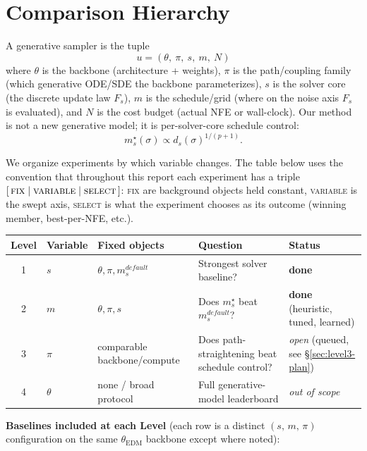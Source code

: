 \documentclass[11pt]{article}
\begin{document}
\section{Comparison Hierarchy}

A generative sampler is the tuple
\[
u = (\theta,\ \pi,\ s,\ m,\ N)
\]
where \(\theta\) is the backbone (architecture + weights), \(\pi\) is the path/coupling family (which generative ODE/SDE the backbone parameterizes), \(s\) is the solver core (the discrete update law \(F_s\)), \(m\) is the schedule/grid (where on the noise axis \(F_s\) is evaluated), and \(N\) is the cost budget (actual NFE or wall-clock). Our method is not a new generative model; it is per-solver-core schedule control:
\[
m^\star_s(\sigma) \propto d_s(\sigma)^{1/(p+1)}.
\]

We organize experiments by which variable changes. The table below uses
the convention that throughout this report each experiment has a triple
\([\,\textsc{fix} \mid \textsc{variable} \mid \textsc{select}\,]\):
\textsc{fix} are background objects held constant, \textsc{variable}
is the swept axis, \textsc{select} is what the experiment chooses as
its outcome (winning member, best-per-NFE, etc.).

\begin{center}
\scriptsize
\begin{tabular}{c l l p{4.4cm} l}
\toprule
Level & Variable & Fixed objects & Question & Status \\
\midrule
1 & \(s\)      & \(\theta,\pi,m_s^{default}\)         & Strongest solver baseline? & \textbf{done} \\
2 & \(m\)      & \(\theta,\pi,s\)                     & Does \(m^\star_s\) beat \(m_s^{default}\)? & \textbf{done} (heuristic, tuned, learned) \\
3 & \(\pi\)    & comparable backbone/compute          & Does path-straightening beat schedule control? & \emph{open} (queued, see \S\ref{sec:level3-plan}) \\
4 & \(\theta\) & none / broad protocol                & Full generative-model leaderboard & \emph{out of scope} \\
\bottomrule
\end{tabular}
\end{center}

\noindent
\textbf{Baselines included at each Level} (each row is a distinct
\((s,\,m,\,\pi)\) configuration on the same \(\theta_{\mathrm{EDM}}\)
backbone except where noted):
\end{document}
